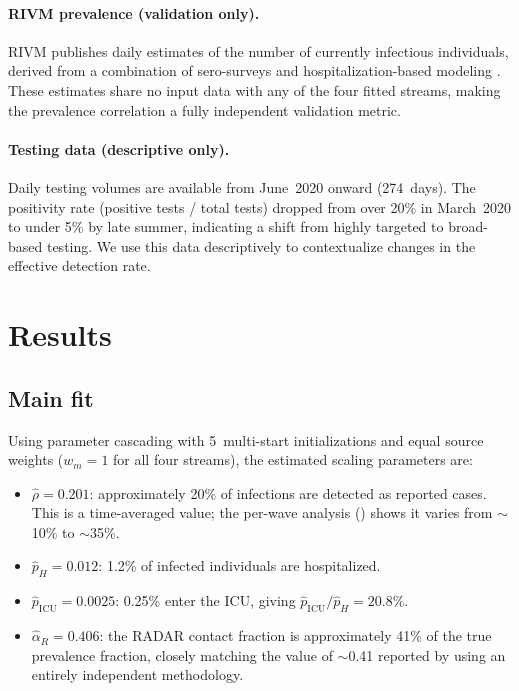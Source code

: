 \documentclass[11pt]{article}
\begin{document}
\paragraph{RIVM prevalence (validation only).} RIVM publishes daily estimates of the number of currently infectious individuals, derived from a combination of sero-surveys and hospitalization-based modeling \citep{Vos2021}. These estimates share no input data with any of the four fitted streams, making the prevalence correlation a fully independent validation metric.

\paragraph{Testing data (descriptive only).} Daily testing volumes are available from June~2020 onward (274~days). The positivity rate (positive tests / total tests) dropped from over 20\% in March~2020 to under 5\% by late summer, indicating a shift from highly targeted to broad-based testing. We use this data descriptively to contextualize changes in the effective detection rate.


\section{Results}\label{sec:results}

\subsection{Main fit}\label{sec:results:main}

Using parameter cascading with 5~multi-start initializations and equal source weights ($w_m=1$ for all four streams), the estimated scaling parameters are:
\begin{itemize}
  \item $\hat{\rho}=0.201$: approximately 20\% of infections are detected as reported cases. This is a time-averaged value; the per-wave analysis () shows it varies from $\sim$10\% to $\sim$35\%.
  \item $\hat{p}_H=0.012$: 1.2\% of infected individuals are hospitalized.
  \item $\hat{p}_{\mathrm{ICU}}=0.0025$: 0.25\% enter the ICU, giving $\hat{p}_{\mathrm{ICU}}/\hat{p}_H=20.8\%$.
  \item $\hat{\alpha}_R=0.406$: the RADAR contact fraction is approximately 41\% of the true prevalence fraction, closely matching the value of $\sim$0.41 reported by \citet{SchootUiterkamp2025} using an entirely independent methodology.
\end{itemize}
\end{document}

